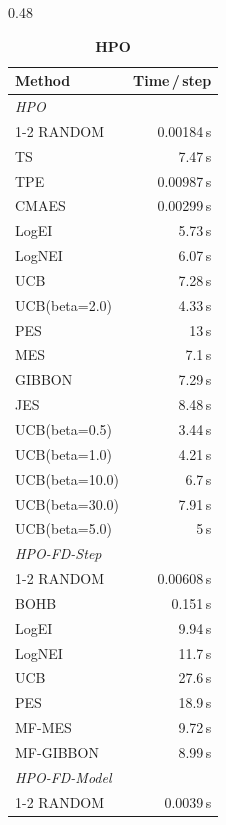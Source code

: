 \begin{table}[h]
  \centering
  \caption{Mean wall-clock time per BO step --- HPO and data mixture problems.}
  \label{tab:wall_clock_hpo_dmo}
  \begin{subtable}[t]{0.48\textwidth}
    \centering
    \footnotesize
    \caption{\textbf{HPO}}
    \begin{tabular}{lr}
      \toprule
      \textbf{Method} & \textbf{Time\,/\,step} \\
      \midrule
      \multicolumn{2}{l}{\textit{HPO}} \\
      \cmidrule{1-2}
      RANDOM & 0.00184\,s \\
      TS & 7.47\,s \\
      TPE & 0.00987\,s \\
      CMAES & 0.00299\,s \\
      LogEI & 5.73\,s \\
      LogNEI & 6.07\,s \\
      UCB & 7.28\,s \\
      UCB(beta=2.0) & 4.33\,s \\
      PES & 13\,s \\
      MES & 7.1\,s \\
      GIBBON & 7.29\,s \\
      JES & 8.48\,s \\
      UCB(beta=0.5) & 3.44\,s \\
      UCB(beta=1.0) & 4.21\,s \\
      UCB(beta=10.0) & 6.7\,s \\
      UCB(beta=30.0) & 7.91\,s \\
      UCB(beta=5.0) & 5\,s \\
      \midrule
      \multicolumn{2}{l}{\textit{HPO-FD-Step}} \\
      \cmidrule{1-2}
      RANDOM & 0.00608\,s \\
      BOHB & 0.151\,s \\
      LogEI & 9.94\,s \\
      LogNEI & 11.7\,s \\
      UCB & 27.6\,s \\
      PES & 18.9\,s \\
      MF-MES & 9.72\,s \\
      MF-GIBBON & 8.99\,s \\
      \midrule
      \multicolumn{2}{l}{\textit{HPO-FD-Model}} \\
      \cmidrule{1-2}
      RANDOM & 0.0039\,s \\

\end{tabular}
\end{subtable}
\end{table}
